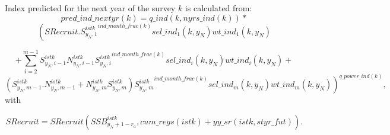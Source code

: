 \documentclass{article}
\begin{document}
Index predicted for the next year of the survey $k$ is calculated from:
\begin{equation}
    pred\_ind\_nextyr(k)=q\_ind(k,nyrs\_ind(k)) * 
\end{equation}
\begin{equation*}
    \left( SRecruit. {S^{istk}_{y_N,1}}^{ind\_month\_frac(k)} sel\_ind_1(k,y_N)  wt\_ind_1(k,y_N)\right.
\end{equation*}

\begin{equation}
+\sum_{i=2}^{m-1}S^{istk}_{y_N,i-1}N^{istk}_{y_N,i-1}{S^{istk}_{y_N,i}}^{ind\_month\_frac(k)} sel\_ind_i(k,y_N)  wt\_ind_i(k,y_N)+
\end{equation}
\begin{equation*}
  \left. (S^{istk}_{y_N,m-1}.N^{istk}_{y_N,m-1}+N^{istk}_{y_N,m}S^{istk}_{y_N,m}){S^{istk}_{y_N,m}}^{ind\_month\_frac(k)} sel\_ind_m(k,y_N)  wt\_ind_m(k,y_N) \right)^{q\_power\_ind(k)},
\end{equation*}
with

\begin{equation}
    SRecruit=SRecruit(SSB^{istk}_{y_N+1-r_a},cum\_regs(istk)+yy\_sr(istk,styr\_fut)).
\end{equation}
\end{document}
